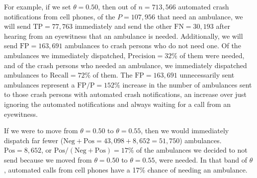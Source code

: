 For example, if we set $\theta = 0.50$, then out of $n = 713,566$ automated crash notifications from cell phones, of the $P=107,956$ that need an ambulance, we will send $\text{TP} = 77,763$  immediately and send the other $\text{FN} = 30,193$ after hearing from an eyewitness that an ambulance is needed.  Additionally, we will send $\text{FP} = 163,691$ ambulances to crash persons who do not need one.  Of the ambulances we immediately dispatched, $\text{Precision} = 32\%$ of them were needed, and of the crash persons who needed an ambulance, we immediately dispatched ambulances to $\text{Recall} = 72\%$ of them.  The $\text{FP} = 163,691$ unnecessarily sent ambulances represent a $\text{FP}/\text{P} = 152\%$ increase in the number of ambulances sent to those crash persons with automated crash notifications, an increase over just ignoring the automated notifications and always waiting for a call from an eyewitness.

If we were to move from $\theta = 0.50$ to $\theta=0.55$, then we would immediately dispatch far fewer ($\text{Neg} + \text{Pos} = 43,098 + 8,652 = 51,750$) ambulances.  $\text{Pos} = 8,652$, or $\text{Pos}/(\text{Neg} + \text{Pos}) = 17\%$ of the ambulances we decided to not send because we moved from $\theta = 0.50$ to $\theta = 0.55$, were needed.  In that band of $\theta$, automated calls from cell phones have a 17\% chance of needing an ambulance.  

